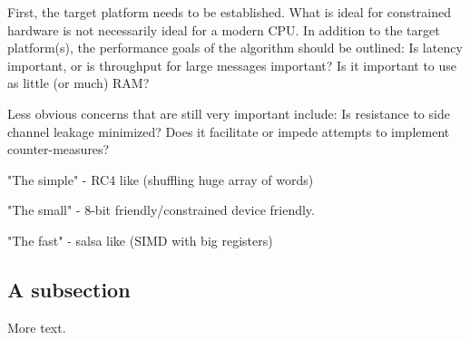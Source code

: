 \documentclass[11pt]{article} %
\begin{document}
First, the target platform needs to be established. What is ideal for constrained hardware is not necessarily ideal for a modern CPU. In addition to the target platform(s), the performance goals of the algorithm should be outlined: Is latency important, or is throughput for large messages important? Is it important to use as little (or much) RAM? 

Less obvious concerns that are still very important include: Is resistance to side channel leakage minimized? Does it facilitate or impede attempts to implement counter-measures?



"The simple" - RC4 like (shuffling huge array of words)

"The small" - 8-bit friendly/constrained device friendly.

"The fast" - salsa like (SIMD with big registers)

\subsection{A subsection}

More text.
\end{document}
